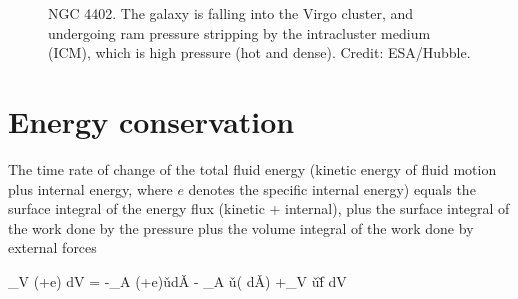 \begin{figure}
  \begin{center}
  \end{center}
  \caption[]{NGC 4402. The galaxy is falling into the Virgo
cluster, and undergoing ram pressure stripping by the intracluster
medium (ICM), which is high pressure (hot and dense). Credit: ESA/Hubble.}
  \label{fig:rampressure-galaxy}
\end{figure}


\section{Energy conservation}

The time rate of change of the total fluid energy (kinetic energy of fluid motion plus
internal energy, where $e$ denotes the specific internal energy) equals the surface integral
of the energy flux (kinetic + internal), plus the surface integral of the work done by the
pressure plus the volume integral of the work done by external forces

\beq
{} \int_V \left(+\rho e\right) dV =
-\oint_A \left(+\rho e\right)\v{u}\cdot d\v{A} -
\oint_A \v{u}\cdot \left( \cdot d\v{A}\right)  +\int_V \rho \v{u}\cdot\v{f} dV
\eeq

